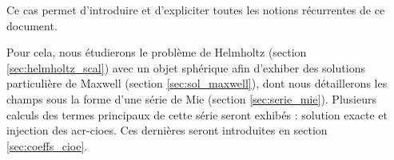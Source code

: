 Ce cas permet d'introduire et d'expliciter toutes les notions récurrentes de ce document.


Pour cela, nous étudierons le problème de Helmholtz (section \ref{sec:helmholtz_scal}) avec un objet sphérique afin d'exhiber des solutions particulière de Maxwell (section \ref{sec:sol_maxwell}), dont nous détaillerons les champs sous la forme d'une série de Mie (section \ref{sec:serie_mie}).
Plusieurs calculs des termes principaux de cette série seront exhibés : solution exacte et injection des \glspl{acr-cioe}.
Ces dernières seront introduites en section  \ref{sec:coeffs_cioe}.



